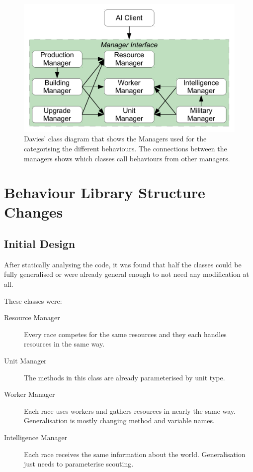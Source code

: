 \documentclass[11pt,openright,a4paper]{report}
\begin{document}
\begin{figure}[h]
    \centering
    \includegraphics[scale=0.5]{OrigClassDia}
    \caption{Davies' class diagram that shows the Managers used for the categorising the different behaviours. The connections between the managers shows which classes call behaviours from other managers.\protect\cite{davies2012}}
    \label{fig:SimonClassDia}
\end{figure}

\section{Behaviour Library Structure Changes}
\subsection{Initial Design}
After statically analysing the code, it was found that half the classes could be fully generalised or were already general enough to not need any modification at all.

These classes were:
\begin{description}
\item[Resource Manager]Every race competes for the same resources and they each handles resources in the same way.
\item[Unit Manager]The methods in this class are already parameterised by unit type.
\item[Worker Manager]Each race uses workers and gathers resources in nearly the same way. Generalisation is mostly changing method and variable names.
\item[Intelligence Manager]Each race receives the same information about the world. Generalisation just needs to parameterise scouting.
\end{description}
\end{document}
